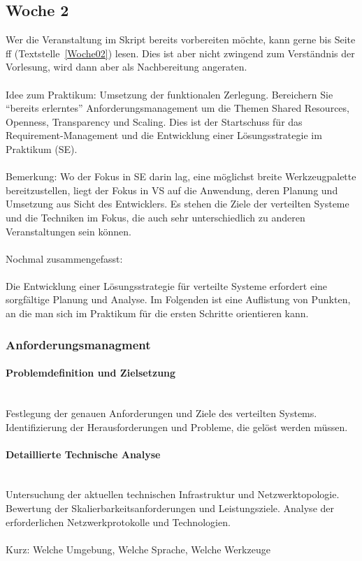 \subsection{Woche 2}
Wer die Veranstaltung im Skript bereits vorbereiten möchte, kann gerne bis Seite \pageref{Woche02}ff (Textstelle~\ref{Woche02}) lesen. Dies ist aber nicht zwingend zum Verständnis der Vorlesung, wird dann aber als Nachbereitung angeraten.
\\\\
Idee zum Praktikum: Umsetzung der funktionalen Zerlegung. Bereichern Sie \enquote{bereits erlerntes} Anforderungsmanagement um die Themen Shared Resources, Openness, Transparency und Scaling. Dies ist der Startschuss für das Requirement-Management und die Entwicklung einer Lösungsstrategie im Praktikum (SE).
\\\\
Bemerkung: Wo der Fokus in SE darin lag, eine möglichst breite Werkzeugpalette bereitzustellen, liegt der Fokus in VS auf die Anwendung, deren Planung und Umsetzung aus Sicht des Entwicklers. Es stehen die Ziele der verteilten Systeme und die Techniken im Fokus, die auch sehr unterschiedlich zu anderen Veranstaltungen sein können.  \\\\
Nochmal zusammengefasst:
\\\\
Die Entwicklung einer Lösungsstrategie für verteilte Systeme erfordert eine sorgfältige Planung und Analyse. Im Folgenden ist eine Auflistung von Punkten, an die man sich im Praktikum für die ersten Schritte orientieren kann.

\subsubsection{Anforderungsmanagment}

\paragraph{Problemdefinition und Zielsetzung}
\mbox{}\\
Festlegung der genauen Anforderungen und Ziele des verteilten Systems.
Identifizierung der Herausforderungen und Probleme, die gelöst werden müssen.

\paragraph{Detaillierte Technische Analyse}
\mbox{}\\
Untersuchung der aktuellen technischen Infrastruktur und Netzwerktopologie.	Bewertung der Skalierbarkeitsanforderungen und Leistungsziele. Analyse der erforderlichen Netzwerkprotokolle und Technologien.
\\\\
Kurz: Welche Umgebung, Welche Sprache, Welche Werkzeuge
